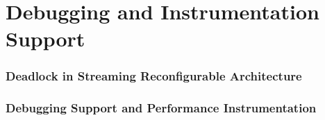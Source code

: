\section{Debugging and Instrumentation Support}
\subsubsection{Deadlock in Streaming Reconfigurable Architecture}

\subsubsection{Debugging Support and Performance Instrumentation}
